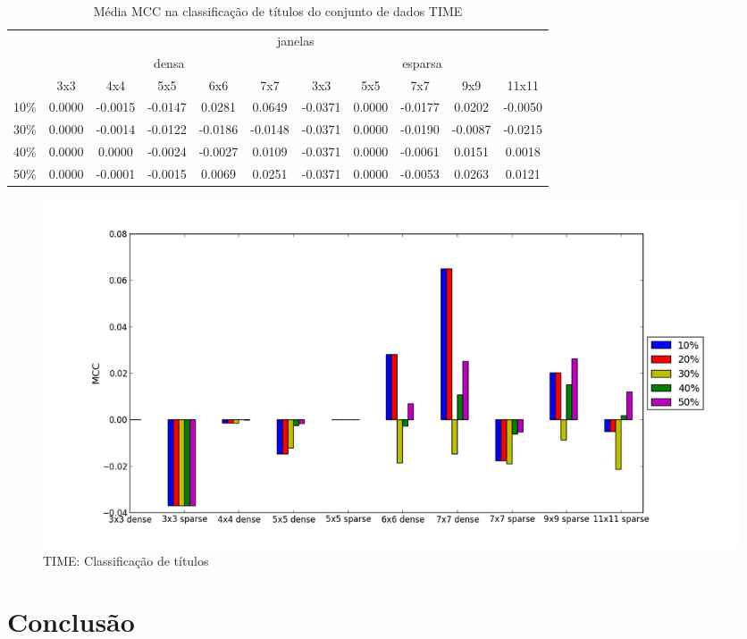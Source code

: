 \documentclass[a4paper,11pt]{article}
\begin{document}
  \begin{center}
    \begin{table}[p]
      \caption{Média MCC na classificação de títulos do conjunto de dados TIME}
      \begin{tabular}{ l | c c c c c || c c c c c | }
        \cline{2-11}
        & \multicolumn{10}{|c|}{janelas} \\
        \cline{2-11}
        & \multicolumn{5}{c||}{densa} & \multicolumn{5}{c|}{esparsa} \\
        \cline{2-11}
        & 3x3 & 4x4 & 5x5 & 6x6 & 7x7 & 3x3 & 5x5 & 7x7 & 9x9 & 11x11 \\
        \hline
        \multicolumn{1}{|l|}{10\%}& 0.0000& -0.0015& -0.0147& 0.0281& 0.0649& -0.0371& 0.0000& -0.0177& 0.0202& -0.0050\\
        \multicolumn{1}{|l|}{30\%}& 0.0000& -0.0014& -0.0122& -0.0186& -0.0148& -0.0371& 0.0000& -0.0190& -0.0087& -0.0215\\
        \multicolumn{1}{|l|}{40\%}& 0.0000& 0.0000& -0.0024& -0.0027& 0.0109& -0.0371& 0.0000& -0.0061& 0.0151& 0.0018\\
        \multicolumn{1}{|l|}{50\%}& 0.0000& -0.0001& -0.0015& 0.0069& 0.0251& -0.0371& 0.0000& -0.0053& 0.0263& 0.0121\\
        \hline  
      \end{tabular}
    \end{table}
  \end{center}

  \begin{figure}[p]
    \centerline{\includegraphics[width=1.2\textwidth]{assets/experiment_charts/time_TextRegion_heading_mcc.png}}
    \caption{TIME: Classificação de títulos}
    \label{fig:time_TextRegion_heading_mcc}
  \end{figure}

\section{Conclusão}
\end{document}
